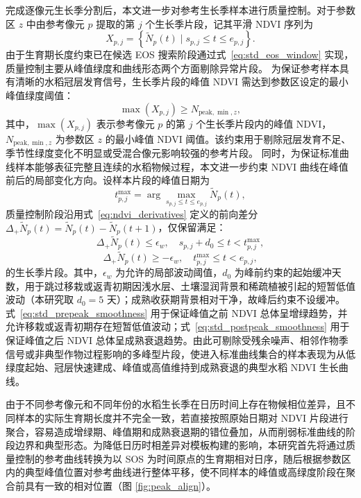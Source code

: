 完成逐像元生长季分割后，本文进一步对参考生长季样本进行质量控制。对于参数区 \(z\) 中由参考像元 \(p\) 提取的第 \(j\) 个生长季片段，记其平滑 NDVI 序列为
\[
    X_{p,j}=\left\{\widetilde{N}_p(t)\mid s_{p,j}\leq t\leq e_{p,j}\right\}.
\]
由于生育期长度约束已在候选 EOS 搜索阶段通过式~\ref{eq:std_eos_window} 实现，质量控制主要从峰值绿度和曲线形态两个方面剔除异常片段。
为保证参考样本具有清晰的水稻冠层发育信号，生长季片段的峰值 NDVI 需达到参数区设定的最小峰值绿度阈值：
\begin{equation}
    \max\left(X_{p,j}\right)\geq N_{\mathrm{peak},\min,z},
    \label{eq:std_peak_threshold}
\end{equation}
其中，\(\max\left(X_{p,j}\right)\) 表示参考像元 \(p\) 的第 \(j\) 个生长季片段内的峰值 NDVI，\(N_{\mathrm{peak},\min,z}\) 为参数区 \(z\) 的最小峰值 NDVI 阈值。该约束用于剔除冠层发育不足、季节性绿度变化不明显或受混合像元影响较强的参考片段。
同时，为保证标准曲线样本能够表征完整且连续的水稻物候过程，本文进一步约束 NDVI 曲线在峰值前后的局部变化方向。设样本片段的峰值日期为
\begin{equation}
    t^{\max}_{p,j}
    =
    \arg\max_{s_{p,j}\leq t\leq e_{p,j}}
    \widetilde{N}_p(t),
    \label{eq:std_peak_date}
\end{equation}
质量控制阶段沿用式~\ref{eq:ndvi_derivatives} 定义的前向差分 \(\Delta_{+}\widetilde{N}_p(t)=\widetilde{N}_p(t)-\widetilde{N}_p(t+1)\)，仅保留满足：
\begin{equation}
    \Delta_{+}\widetilde{N}_p(t)\leq \epsilon_w,
    \quad s_{p,j}+d_0\leq t<t^{\max}_{p,j},
    \label{eq:std_prepeak_smoothness}
\end{equation}
\begin{equation}
    \Delta_{+}\widetilde{N}_p(t)\geq -\epsilon_w,
    \quad t^{\max}_{p,j}\leq t<e_{p,j},
    \label{eq:std_postpeak_smoothness}
\end{equation}
的生长季片段。其中，\(\epsilon_w\) 为允许的局部波动阈值，\(d_0\) 为峰前约束的起始缓冲天数，用于跳过移栽或返青初期因浅水层、土壤湿润背景和稀疏植被引起的短暂低值波动（本研究取 \(d_0=5\) 天）；成熟收获期背景相对干净，故峰后约束不设缓冲。式~\ref{eq:std_prepeak_smoothness} 用于保证峰值之前 NDVI 总体呈增绿趋势，并允许移栽或返青初期存在短暂低值波动；式~\ref{eq:std_postpeak_smoothness} 用于保证峰值之后 NDVI 总体呈成熟衰退趋势。由此可剔除受残余噪声、相邻作物季信号或非典型作物过程影响的多峰型片段，使进入标准曲线集合的样本表现为从低绿度起始、冠层快速建成、峰值或高值维持到成熟衰退的典型水稻 NDVI 生长曲线。

由于不同参考像元和不同年份的水稻生长季在日历时间上存在物候相位差异，且不同样本的实际生育期长度并不完全一致，若直接按照原始日期对 NDVI 片段进行聚合，容易造成增绿期、峰值期和成熟衰退期的错位叠加，从而削弱标准曲线的阶段边界和典型形态。为降低日历时相差异对模板构建的影响，本研究首先将通过质量控制的参考曲线转换为以 SOS 为时间原点的生育期相对日序，随后根据参数区内的典型峰值位置对参考曲线进行整体平移，使不同样本的峰值或高绿度阶段在聚合前具有一致的相对位置（图 \ref{fig:peak_align}）。

